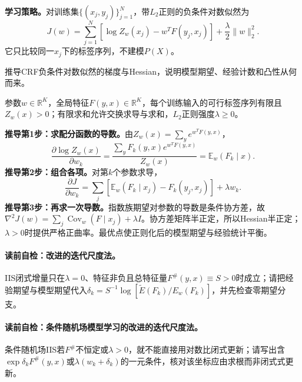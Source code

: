 \label{struct:V3-C06-CH09}
\textbf{学习策略。}对训练集$\{(x_j,y_j)\}_{j=1}^{N}$，带$L_2$正则的负条件对数似然为
\[
J(w)=\sum_{j=1}^{N}\left[
\log Z_w(x_j)-w^TF(y_j,x_j)\right]
+\frac{\lambda}{2}\|w\|_2^2.
\]
它只比较同一$x_j$下的标签序列，不建模$P(X)$。

\label{struct:V3-C06-CH16}

\begin{derivationgoalbox}
推导CRF负条件对数似然的梯度与Hessian，说明模型期望、经验计数和凸性从何而来。
\end{derivationgoalbox}
\begin{derivationprepbox}
参数$w\in\mathbb R^K$，全局特征$F(y,x)\in\mathbb R^K$，每个训练输入的可行标签序列有限且$Z_w(x)>0$；有限求和允许交换求导与求和，$L_2$正则强度$\lambda\geq0$。
\end{derivationprepbox}
\textbf{推导第1步：求配分函数的导数。}由$Z_w(x)=\sum_y e^{w^TF(y,x)}$，
\[
\frac{\partial\log Z_w(x)}{\partial w_k}
=\frac{\sum_yF_k(y,x)e^{w^TF(y,x)}}{Z_w(x)}
=\mathbb E_w(F_k\mid x).
\]
\textbf{推导第2步：组合各项。}对第$k$个参数求导，
\[
\frac{\partial J}{\partial w_k}
=\sum_j\left[
\mathbb E_w(F_k\mid x_j)-F_k(y_j,x_j)
\right]+\lambda w_k.
\]
\textbf{推导第3步：再求一次导数。}指数族期望对参数的导数是条件协方差，故
$\nabla^2J(w)=\sum_j\operatorname{Cov}_w(F\mid x_j)+\lambda I$。协方差矩阵半正定，所以Hessian半正定；$\lambda>0$时提供严格正曲率。最优点使正则化后的模型期望与经验统计平衡。

\paragraph{读前自检：改进的迭代尺度法。}IIS闭式增量只在$\lambda=0$、特征非负且总特征量$F^{\#}(y,x)\equiv S>0$时成立；请把经验期望与模型期望代入$\delta_k=S^{-1}\log[\widetilde E(F_k)/E_w(F_k)]$，并先检查零期望分支。\par
\paragraph{读前自检：条件随机场模型学习的改进的迭代尺度法。}条件随机场IIS若$F^{\#}$不恒定或$\lambda>0$，就不能直接用对数比闭式更新；请写出含$\exp{\delta_kF^{\#}(y,x)}$或$\lambda(w_k+\delta_k)$的一元条件，核对该坐标应由求根而非闭式式更新。\par

